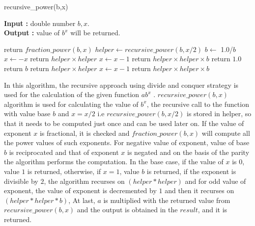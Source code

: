 \documentclass[12pt, a4paper]{article}
\begin{document}
\newpage


\begin{algorithm}[hbt!]
\renewcommand{\thealgorithm}{2.1}
\caption{recursive\_power(b,x)}\label{alg:two}

\hspace*{\algorithmicindent} \textbf{Input : }double number $b,x$. \\
\hspace*{\algorithmicindent} \textbf{Output : }value of $b^x$ will be returned.
\begin{algorithmic}[1]
  \STATE return $ fraction\_power(b,x) $
\ENDIF
\STATE $helper \gets recursive\_power(b,x/2)$
  \STATE $ b  \gets $ 1.0/$ b $
  \STATE $ x  \gets  - x $
  \STATE return $helper \times helper$
  \ELSE
  \STATE $x \gets x - 1$
  \STATE return $helper \times helper \times b$
\ENDIF
{}
  \STATE return $1.0$
  \STATE return $b$
  \STATE return $helper \times helper$
\ELSE
  \STATE $x \gets x - 1$
  \STATE return $helper \times helper \times b$
\ENDIF
\end{algorithmic}
\end{algorithm}

In this algorithm, the recursive approach using divide and conquer strategy is used for the calculation of the given function $ab^x$ \cite{Recursive Power Function}. $recursive\_power(b,x)$ algorithm is used for calculating the value of $b^x$, the recursive call to the function with value base $b$ and $x = x/2$ i.e $recursive\_power(b,x/2)$ is stored in helper, so that it needs to be computed just once and can be used later on. If the value of exponent $x$ is fractional, it is checked and $fraction\_power(b,x)$ will compute all the power values of such exponents. For negative value of exponent, value of base $b$ is reciprocated and that of exponent $x$ is negated and on the basis of the parity the algorithm performs the computation. In the base case, if the value of $x$ is 0, value $1$ is returned, otherwise, if $x=1$, value $b$ is returned, if the exponent is divisible by $2$, the algorithm recurses on $(helper * helper)$ and for odd value of exponent, the value of exponent is decremented by $1$ and then it recurses on $(helper * helper * b)$,  At last, $a$ is multiplied with the returned value from $recursive\_power(b,x)$ and the output is obtained in the $result$, and it is returned.
\end{document}
